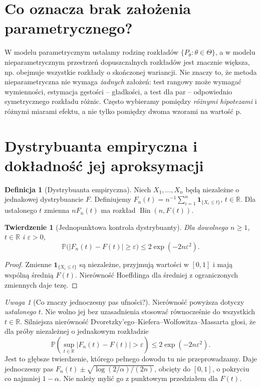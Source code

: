 \documentclass[11pt,a4paper,oneside]{report}
\numberwithin{equation}{chapter}
\theoremstyle{plain}
\newtheorem{twierdzenie}{Twierdzenie}[chapter]
\theoremstyle{definition}
\newtheorem{definicja}{Definicja}[chapter]
\theoremstyle{remark}
\newtheorem{uwaga}{Uwaga}[chapter]
\newcommand{\R}{\mathbb R}
\newcommand{\Prob}{\mathbb P}
\newcommand{\ind}[1]{\mathbf 1_{#1}}
\DeclareMathOperator{\Bin}{Bin}
\begin{document}
\section{Co oznacza brak założenia parametrycznego?}
W modelu parametrycznym ustalamy rodzinę rozkładów
$\{P_\theta:\theta\in\Theta\}$, a w modelu nieparametrycznym
przestrzeń dopuszczalnych rozkładów jest znacznie większa,
np. obejmuje wszystkie rozkłady o skończonej wariancji.
Nie znaczy to, że metoda nieparametryczna nie wymaga
\emph{żadnych} założeń: test rangowy może wymagać wymienności,
estymacja gęstości -- gładkości, a test dla par -- odpowiednio
symetrycznego rozkładu różnic. Często wybieramy pomiędzy
\emph{różnymi hipotezami} i różnymi miarami efektu,
a nie tylko pomiędzy dwoma wzorami na wartość p.

\section{Dystrybuanta empiryczna i dokładność jej aproksymacji}
\begin{definicja}[Dystrybuanta empiryczna]
Niech $X_1,\ldots,X_n$ będą niezależne o jednakowej
dystrybuancie $F$. Definiujemy
$F_n(t)=n^{-1}\sum_{i=1}^n\ind{\{X_i\le t\}}$,
$t\in\R$. Dla ustalonego $t$ zmienna $nF_n(t)$
ma rozkład $\Bin(n,F(t))$.
\end{definicja}

\begin{twierdzenie}[Jednopunktowa kontrola dystrybuanty]
\label{thm:empirical-hoeffding}
Dla dowolnego $n\ge1$, $t\in\R$ i $\varepsilon>0$,
\[
 \Prob\bigl(|F_n(t)-F(t)|\ge\varepsilon\bigr)
 \le2\exp(-2n\varepsilon^2).
\]
\end{twierdzenie}
\begin{proof}
Zmienne $\ind{\{X_i\le t\}}$ są niezależne, przyjmują
wartości w $[0,1]$ i mają wspólną średnią $F(t)$.
Nierówność Hoeffdinga dla średniej z ograniczonych
zmiennych daje tezę.
\end{proof}

\begin{uwaga}[Co znaczy jednoczesny pas ufności?]
Nierówność powyższa dotyczy \emph{ustalonego} $t$.
Nie wolno jej bez uzasadnienia stosować równocześnie
do wszystkich $t\in\R$. Silniejsza nierówność
Dvoretzky'ego--Kiefera--Wolfowitza--Massarta głosi,
że dla próby niezależnej o jednakowym rozkładzie
\[
 \Prob\left(\sup_{t\in\R}|F_n(t)-F(t)|>\varepsilon\right)
 \le2\exp(-2n\varepsilon^2).
\]
Jest to głębsze twierdzenie, którego pełnego dowodu
tu nie przeprowadzamy. Daje jednoczesny pas
$F_n(t)\pm\sqrt{\log(2/\alpha)/(2n)}$, obcięty do
$[0,1]$, o pokryciu co najmniej $1-\alpha$.
Nie należy mylić go z punktowym przedziałem dla $F(t)$.
\end{uwaga}
\end{document}
